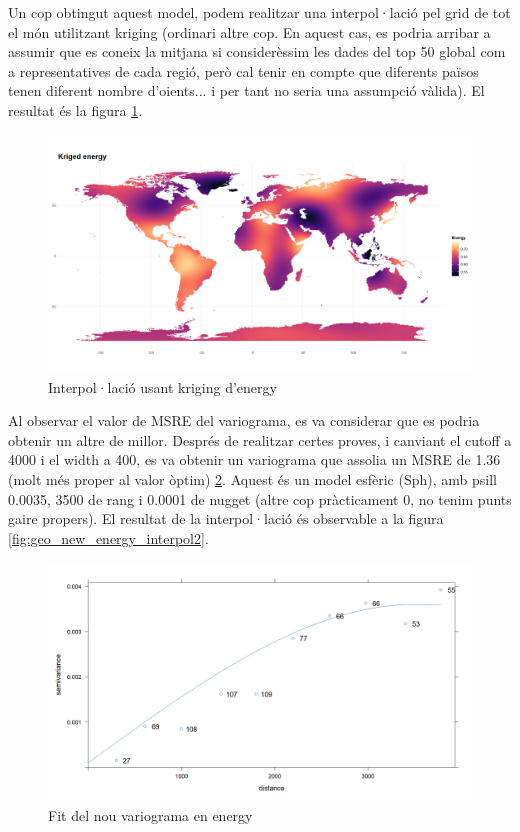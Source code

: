 Un cop obtingut aquest model, podem realitzar una interpol·lació pel grid de tot el món utilitzant kriging (ordinari altre cop. En aquest cas, es podria arribar a assumir que es coneix la mitjana si considerèssim les dades del top 50 global com a representatives de cada regió, però cal tenir en compte que diferents països tenen diferent nombre d'oients... i per tant no seria una assumpció vàlida). El resultat és la figura \ref{fig:geo_new_energy_interpol}.

\begin{figure}[H]
    \centering
    \includegraphics[width=0.8\linewidth]{Images//7_Geospatial//3_new/energy_interpolation.png}
    \caption{Interpol·lació usant kriging d'energy}
    \label{fig:geo_new_energy_interpol}
\end{figure}

Al observar el valor de MSRE del variograma, es va considerar que es podria obtenir un altre de millor. Després de realitzar certes proves, i canviant el cutoff a 4000 i el width a 400, es va obtenir un variograma que assolia un MSRE de 1.36 (molt més proper al valor òptim) \ref{fig:geo_new_energy_fit2}. Aquest és un model esfèric (Sph), amb psill 0.0035, 3500 de rang i 0.0001 de nugget (altre cop pràcticament 0, no tenim punts gaire propers). El resultat de la interpol·lació és observable a la figura \ref{fig:geo_new_energy_interpol2}.

\begin{figure}[H]
    \centering
    \includegraphics[width=0.5\linewidth]{Images//7_Geospatial//3_new/variograma_energy_new2.png}
    \caption{Fit del nou variograma en energy}
    \label{fig:geo_new_energy_fit2}
\end{figure}

